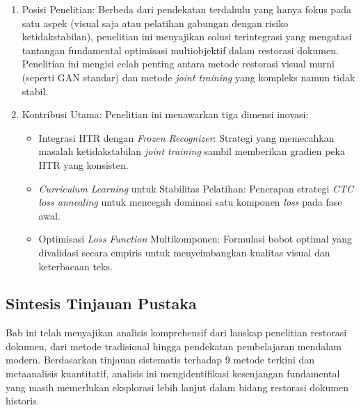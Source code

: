 \begin{enumerate}[leftmargin=1.5em, labelsep=0.5em, itemindent=0pt, label=\arabic*., topsep=0pt, parsep=0pt, itemsep=0.5em]
      \item Posisi Penelitian: Berbeda dari pendekatan terdahulu yang hanya fokus pada satu aspek (visual saja atau pelatihan gabungan dengan risiko ketidakstabilan), penelitian ini menyajikan solusi terintegrasi yang mengatasi tantangan fundamental optimisasi multiobjektif dalam restorasi dokumen. Penelitian ini mengisi celah penting antara metode restorasi visual murni (seperti GAN standar) dan metode \textit{joint training} yang kompleks namun tidak stabil.

      \item Kontribusi Utama: Penelitian ini menawarkan tiga dimensi inovasi:
            \begin{itemize}[leftmargin=1.5em, labelsep=0.5em, topsep=0pt, parsep=0pt, itemsep=0.2em]
                  \item Integrasi HTR dengan \textit{Frozen Recognizer}: Strategi yang memecahkan masalah ketidakstabilan \textit{joint training} sambil memberikan gradien peka HTR yang konsisten.
                  \item \textit{Curriculum Learning} untuk Stabilitas Pelatihan: Penerapan strategi \textit{CTC loss annealing} untuk mencegah dominasi satu komponen \textit{loss} pada fase awal.
                  \item Optimisasi \textit{Loss Function} Multikomponen: Formulasi bobot optimal yang divalidasi secara empiris untuk menyeimbangkan kualitas visual dan keterbacaan teks.
            \end{itemize}
\end{enumerate}


\subsection{Sintesis Tinjauan Pustaka}
\label{subsec:tinjauan-summary}

Bab ini telah menyajikan analisis komprehensif dari lanskap penelitian restorasi dokumen, dari metode tradisional hingga pendekatan pembelajaran mendalam modern. Berdasarkan tinjauan sistematis terhadap 9 metode terkini dan metaanalisis kuantitatif, analisis ini mengidentifikasi kesenjangan fundamental yang masih memerlukan eksplorasi lebih lanjut dalam bidang restorasi dokumen historis.


